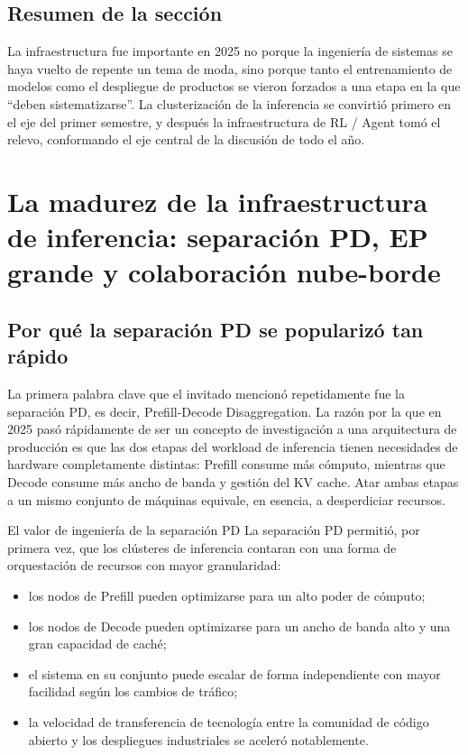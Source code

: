 \documentclass[a4paper]{article}
\begin{document}
\subsection{Resumen de la sección}
La infraestructura fue importante en 2025 no porque la ingeniería de sistemas se haya vuelto de repente un tema de moda, sino porque tanto el entrenamiento de modelos como el despliegue de productos se vieron forzados a una etapa en la que ``deben sistematizarse''. La clusterización de la inferencia se convirtió primero en el eje del primer semestre, y después la infraestructura de RL / Agent tomó el relevo, conformando el eje central de la discusión de todo el año.
\section{La madurez de la infraestructura de inferencia: separación PD, EP grande y colaboración nube-borde}

\subsection{Por qué la separación PD se popularizó tan rápido}
La primera palabra clave que el invitado mencionó repetidamente fue la separación PD, es decir, Prefill-Decode Disaggregation. La razón por la que en 2025 pasó rápidamente de ser un concepto de investigación a una arquitectura de producción es que las dos etapas del workload de inferencia tienen necesidades de hardware completamente distintas: Prefill consume más cómputo, mientras que Decode consume más ancho de banda y gestión del KV cache. Atar ambas etapas a un mismo conjunto de máquinas equivale, en esencia, a desperdiciar recursos.

\begin{importantbox}{El valor de ingeniería de la separación PD}
La separación PD permitió, por primera vez, que los clústeres de inferencia contaran con una forma de orquestación de recursos con mayor granularidad:
\begin{itemize}
  \item los nodos de Prefill pueden optimizarse para un alto poder de cómputo;
  \item los nodos de Decode pueden optimizarse para un ancho de banda alto y una gran capacidad de caché;
  \item el sistema en su conjunto puede escalar de forma independiente con mayor facilidad según los cambios de tráfico;
  \item la velocidad de transferencia de tecnología entre la comunidad de código abierto y los despliegues industriales se aceleró notablemente.
\end{itemize}
\end{importantbox}
\end{document}
